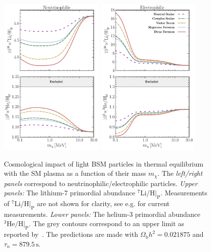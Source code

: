 \documentclass[notitlepage,letterpaper,natbib,aps,prd,onecolumn,amsmath,amsfonts,nofootinbib,preprintnumbers,superscriptaddress,secnumarabic,groupedaddress]{revtex4-1}
\begin{document}
\begin{figure}[!ht]
    \centering
    \includegraphics[width=0.46\textwidth]{figures/Nu_extra_abundance_plot.pdf} \qquad
    \includegraphics[width=0.45\textwidth]{figures/EE_extra_abundance_plot.pdf}
    \caption{Cosmological impact of light BSM particles in thermal equilibrium with the SM plasma as a function of their mass $m_\chi$. The \textit{left/right panels} correspond to neutrinophilic/electrophilic particles. \textit{Upper panels:} The lithium-7 primordial abundance $^7\mathrm{Li}/\mathrm{H}|_\mathrm{P}$. Measurements of $^7\mathrm{Li}/\mathrm{H}|_\mathrm{P}$ are not shown for clarity, see e.g. \cite{pdg} for current measurements. \textit{Lower panels:} The helium-3 primordial abundance $^3\mathrm{He}/\mathrm{H}|_\mathrm{P}$. The grey contours correspond to an upper limit as reported by~\cite{Bania:2002yj}. The predictions are made with $\Omega_\mathrm{b} h^2 = 0.021875$ and $\tau_n = 879.5\,\text{s}$.}
    \label{fig:Cosmoimply_other}
\end{figure}
\end{document}

